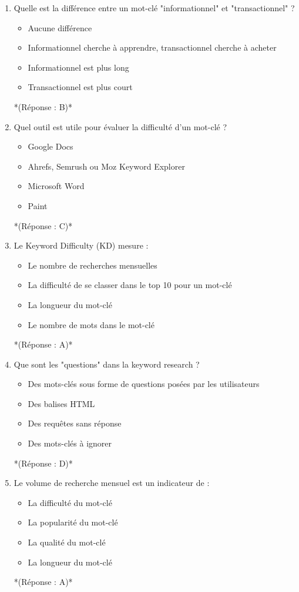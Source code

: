 \documentclass[12pt,a4paper,twoside]{report}
\begin{document}
\begin{enumerate}
\item Quelle est la différence entre un mot-clé "informationnel" et "transactionnel" ?
\begin{itemize}
\item[A)] Aucune différence
\item[B)] Informationnel cherche à apprendre, transactionnel cherche à acheter
\item[C)] Informationnel est plus long
\item[D)] Transactionnel est plus court
\end{itemize}
*(Réponse : B)*

\item Quel outil est utile pour évaluer la difficulté d'un mot-clé ?
\begin{itemize}
\item[A)] Google Docs
\item[B)] Ahrefs, Semrush ou Moz Keyword Explorer
\item[C)] Microsoft Word
\item[D)] Paint
\end{itemize}
*(Réponse : C)*

\item Le Keyword Difficulty (KD) mesure :
\begin{itemize}
\item[A)] Le nombre de recherches mensuelles
\item[B)] La difficulté de se classer dans le top 10 pour un mot-clé
\item[C)] La longueur du mot-clé
\item[D)] Le nombre de mots dans le mot-clé
\end{itemize}
*(Réponse : A)*

\item Que sont les "questions" dans la keyword research ?
\begin{itemize}
\item[A)] Des mots-clés sous forme de questions posées par les utilisateurs
\item[B)] Des balises HTML
\item[C)] Des requêtes sans réponse
\item[D)] Des mots-clés à ignorer
\end{itemize}
*(Réponse : D)*

\item Le volume de recherche mensuel est un indicateur de :
\begin{itemize}
\item[A)] La difficulté du mot-clé
\item[B)] La popularité du mot-clé
\item[C)] La qualité du mot-clé
\item[D)] La longueur du mot-clé
\end{itemize}
*(Réponse : A)*


\end{enumerate}
\end{document}
